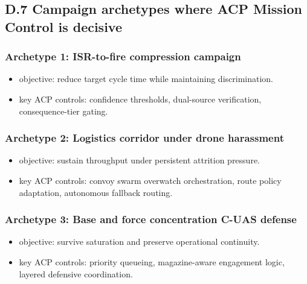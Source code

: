 \documentclass[
]{article}
\providecommand{\tightlist}{%
  \setlength{\itemsep}{0pt}\setlength{\parskip}{0pt}}
\begin{document}
\hypertarget{d.7-campaign-archetypes-where-acp-mission-control-is-decisive}{%
\subsection{D.7 Campaign archetypes where ACP Mission Control is
decisive}\label{d.7-campaign-archetypes-where-acp-mission-control-is-decisive}}

\hypertarget{archetype-1-isr-to-fire-compression-campaign}{%
\subsubsection{Archetype 1: ISR-to-fire compression
campaign}\label{archetype-1-isr-to-fire-compression-campaign}}

\begin{itemize}
\tightlist
\item
  objective: reduce target cycle time while maintaining discrimination.
\item
  key ACP controls: confidence thresholds, dual-source verification,
  consequence-tier gating.
\end{itemize}

\hypertarget{archetype-2-logistics-corridor-under-drone-harassment}{%
\subsubsection{Archetype 2: Logistics corridor under drone
harassment}\label{archetype-2-logistics-corridor-under-drone-harassment}}

\begin{itemize}
\tightlist
\item
  objective: sustain throughput under persistent attrition pressure.
\item
  key ACP controls: convoy swarm overwatch orchestration, route policy
  adaptation, autonomous fallback routing.
\end{itemize}

\hypertarget{archetype-3-base-and-force-concentration-c-uas-defense}{%
\subsubsection{Archetype 3: Base and force concentration C-UAS
defense}\label{archetype-3-base-and-force-concentration-c-uas-defense}}

\begin{itemize}
\tightlist
\item
  objective: survive saturation and preserve operational continuity.
\item
  key ACP controls: priority queueing, magazine-aware engagement logic,
  layered defensive coordination.
\end{itemize}
\end{document}
